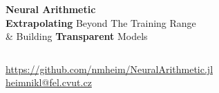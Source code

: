 \documentclass[aspectratio=169,professionalfont,xcolor={dvipsnames},hyperref={colorlinks=true,urlcolor=MidnightBlue}]{beamer}
\begin{document}
\begin{frame}
  \centering
  {\huge\bf Neural Arithmetic} \\
  \vspace{.5cm}
  \textbf{Extrapolating} Beyond The Training Range \\
  \& Building \textbf{Transparent} Models
  \vfill

  \begin{columns}
  \end{columns}
  \vfill

  \vfill
  {\small \url{https://github.com/nmheim/NeuralArithmetic.jl}}\\
  {\small \url{heimnikl@fel.cvut.cz}}
\end{frame}
\end{document}

